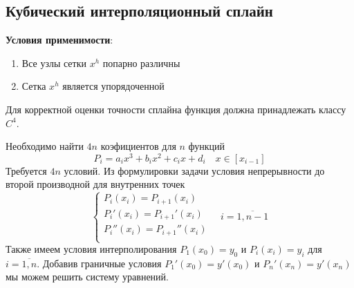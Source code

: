 \documentclass[a4paper]{article}
\begin{document}
\subsection{Кубический интерполяционный сплайн}\label{subsec:spline}
\textbf{Условия применимости}:
\begin{enumerate}
\item\label{item:2} Все узлы сетки \(x^{h}\) попарно различны
  \item Сетка \(x^{h}\) является упорядоченной
\end{enumerate}
Для корректной оценки точности сплайна функция должна принадлежать классу \(C^{4}\).

Необходимо найти \(4n\) коэфициентов для \(n\) функций \[
  P_{i} = a_{i}x^{3}+b_{i}x^2+c_{i}x + d_{i} \quad x \in [x_{i-1}]
\]
Требуется \(4n\) условий. Из формулировки задачи условия непрерывности до второй производной для внутренних точек \[
  \begin{cases}
    P_{i}(x_{i}) = P_{i+1}(x_{i})\\
    P_{i}'(x_{i}) = P_{i+1}'(x_{i})\\
    P_{i}''(x_{i}) = P_{i+1}''(x_{i})\\
  \end{cases} \quad  i = \overline{1,n-1}
\]
Также имеем условия интерполирования \(P_{1}(x_{0}) = y_{0}\) и \(P_{i}(x_{i})=y_{i}\) для \(i = \overline{1,n}\).
Добавив граничные условия \(P_{1}'(x_{0}) = y'(x_{0})\) и \(P_{n}'(x_{n}) = y'(x_{n})\) мы можем решить систему
уравнений.
\end{document}
